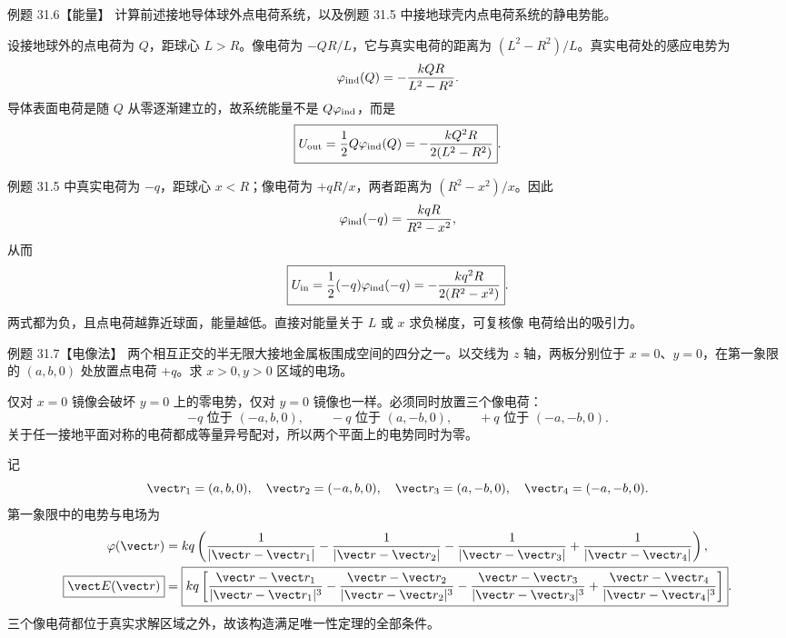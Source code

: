 \Needspace{0.34\textheight}
\begin{origexamplebox}{例题 31.6【能量】}
计算前述接地导体球外点电荷系统，以及例题 31.5 中接地球壳内点电荷系统的静电势能。
\end{origexamplebox}

\begin{xesolution}
设接地球外的点电荷为 $Q$，距球心 $L>R$。像电荷为 $-QR/L$，它与真实电荷的距离为
$(L^2-R^2)/L$。真实电荷处的感应电势为
\[
  \varphi_{\rm ind}(Q)
  =-\frac{kQR}{L^2-R^2}.
\]
导体表面电荷是随 $Q$ 从零逐渐建立的，故系统能量不是 $Q\varphi_{\rm ind}$，而是
\begin{equation}
  \boxed{U_{\rm out}=\frac12Q\varphi_{\rm ind}(Q)
  =-\frac{kQ^2R}{2(L^2-R^2)}}.
\end{equation}

例题 31.5 中真实电荷为 $-q$，距球心 $x<R$；像电荷为 $+qR/x$，两者距离为
$(R^2-x^2)/x$。因此
\[
  \varphi_{\rm ind}(-q)=\frac{kqR}{R^2-x^2},
\]
从而
\begin{equation}
  \boxed{U_{\rm in}=\frac12(-q)\varphi_{\rm ind}(-q)
  =-\frac{kq^2R}{2(R^2-x^2)}}.
\end{equation}
两式都为负，且点电荷越靠近球面，能量越低。直接对能量关于 $L$ 或 $x$ 求负梯度，可复核像
电荷给出的吸引力。
\end{xesolution}

\Needspace{0.38\textheight}
\begin{origexamplebox}{例题 31.7【电像法】}
两个相互正交的半无限大接地金属板围成空间的四分之一。以交线为 $z$ 轴，两板分别位于
$x=0$、$y=0$，在第一象限的 $(a,b,0)$ 处放置点电荷 $+q$。求 $x>0,y>0$ 区域的电场。
\end{origexamplebox}

\begin{xesolution}
仅对 $x=0$ 镜像会破坏 $y=0$ 上的零电势，仅对 $y=0$ 镜像也一样。必须同时放置三个像电荷：
\[
  -q\text{ 位于 }(-a,b,0),\qquad
  -q\text{ 位于 }(a,-b,0),\qquad
  +q\text{ 位于 }(-a,-b,0).
\]
关于任一接地平面对称的电荷都成等量异号配对，所以两个平面上的电势同时为零。

记
\[
  \vect r_1=(a,b,0),\quad \vect r_2=(-a,b,0),\quad
  \vect r_3=(a,-b,0),\quad \vect r_4=(-a,-b,0).
\]
第一象限中的电势与电场为
\begin{align*}
  \varphi(\vect r)&=kq\left(
  \frac1{|\vect r-\vect r_1|}-\frac1{|\vect r-\vect r_2|}
  -\frac1{|\vect r-\vect r_3|}+\frac1{|\vect r-\vect r_4|}\right),\\
  \boxed{\vect E(\vect r)}&=\boxed{kq\left[
  \frac{\vect r-\vect r_1}{|\vect r-\vect r_1|^3}
  -\frac{\vect r-\vect r_2}{|\vect r-\vect r_2|^3}
  -\frac{\vect r-\vect r_3}{|\vect r-\vect r_3|^3}
  +\frac{\vect r-\vect r_4}{|\vect r-\vect r_4|^3}
  \right]}.
\end{align*}
三个像电荷都位于真实求解区域之外，故该构造满足唯一性定理的全部条件。

\quarterPlaneDiagram
\end{xesolution}


